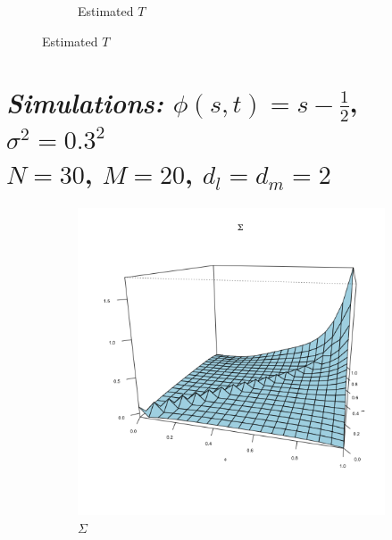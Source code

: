 \documentclass[12pt]{article}
\theoremstyle{definition}
\begin{document}
\begin{center}
\begin{figure}[H]
\begin{subfigure}{.48\textwidth}
 \caption{Estimated $T$}
 \end{subfigure}
     \end{figure}
\end{center}


 



 
\section{\emph{Simulations: }$\phi\left(s,t\right) = s-\frac{1}{2}$, $\sigma^2 = 0.3^2$\\
$N = 30$, $M=20$, $d_l = d_m= 2$}

 \begin{center}
\begin{figure}[H]
 \begin{subfigure}{.48\textwidth}
 \includegraphics{img/linear-vc-model-true-covariance}
 \caption{$\Sigma$ }
 \end{subfigure}
 \begin{subfigure}{.48\textwidth}

\end{subfigure}
\end{figure}
\end{center}
\end{document}

